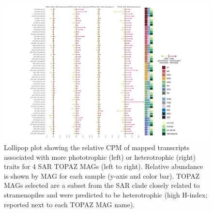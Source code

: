 \documentclass[12pt]{article}
\numberwithin{equation}{section}
\begin{document}
\begin{landscape}
\begin{figure}
    \centering
    \includegraphics[width=0.9\columnwidth]{si-figures/SI-heterotrophs-lolli-05062021.png}
    \caption{Lollipop plot showing the relative CPM of mapped transcripts associated with more phototrophic (left) or heterotrophic (right) traits for 4 SAR TOPAZ MAGs (left to right). Relative abundance is shown by MAG for each sample (y-axis and color bar). TOPAZ MAGs selected are a subset from the SAR clade closely related to stramenopiles and were predicted to be heterotrophic (high H-index; reported next to each TOPAZ MAG name).
    }
    \label{fig:dictyocho-SAR-het-lolli}
\end{figure}
\end{landscape}
\end{document}
